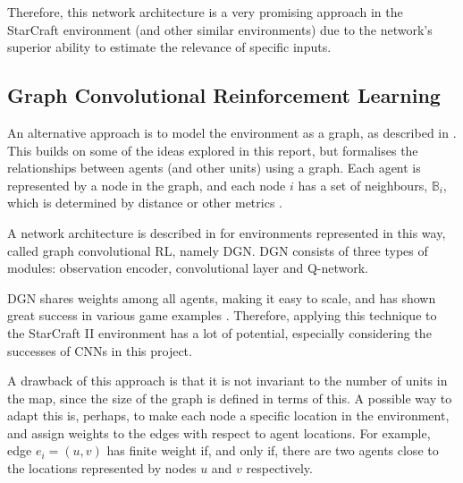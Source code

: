 Therefore, this network architecture is a very promising approach in the StarCraft environment (and other similar environments) due to the network's superior ability to estimate the relevance of specific inputs.


\subsection{Graph Convolutional Reinforcement Learning}

An alternative approach is to model the environment as a graph, as described in \cite{graph}. This builds on some of the ideas explored in this report, but formalises the relationships between agents (and other units) using a graph. Each agent is represented by a node in the graph, and each node $i$ has a set of neighbours, $\mathbb{B}_i$, which is determined by distance or other metrics \cite{graph}.

A network architecture is described in \cite{graph} for environments represented in this way, called graph convolutional RL, namely DGN. DGN consists of three types of modules:  observation encoder, convolutional layer and Q-network. 

DGN shares weights among all agents, making it easy to scale, and has shown great success in various game examples \cite{graph}. Therefore, applying this technique to the StarCraft II environment has a lot of potential, especially considering the successes of CNNs in this project. 

A drawback of this approach is that it is not invariant to the number of units in the map, since the size of the graph is defined in terms of this. A possible way to adapt this is, perhaps, to make each node a specific location in the environment, and assign weights to the edges with respect to agent locations. For example, edge $e_i = (u,v)$ has finite weight if, and only if, there are two agents close to the locations represented by nodes $u$ and $v$ respectively.



